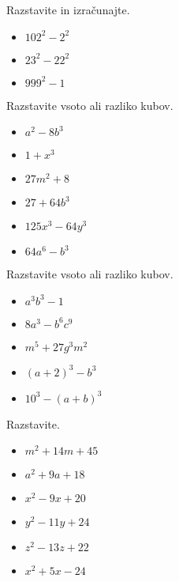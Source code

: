             \begin{naloga}
                Razstavite in izračunajte.
                \begin{itemize}
                    \item $102^2-2^2$  
                    \item $23^2-22^2$  
                    \item $999^2-1$ 
                \end{itemize}
            \end{naloga}
        
    
        
            \begin{naloga}
                Razstavite vsoto ali razliko kubov.
                \begin{itemize}
                    \item $a^2-8b^3$ 
                    \item $1+x^3$ 
                    \item $27m^2+8$ 
                    \item $27+64b^3$ 
                    \item $125x^3-64y^3$ 
                    \item $64a^6-b^3$ 
                \end{itemize}
            \end{naloga}
        
    
        
            \begin{naloga}
                Razstavite vsoto ali razliko kubov.
                \begin{itemize}
                    \item $a^3b^3-1$ 
                    \item $8a^3-b^6c^9$ 
                    \item $m^5+27g^3m^2$ 
                    \item $(a+2)^3-b^3$ 
                    \item $10^3-(a+b)^3$ 
                \end{itemize}
            \end{naloga}
        
    
        
            \begin{naloga}
                Razstavite.
                \begin{itemize}
                    \item $m^2+14m+45$ 
                    \item $a^2+9a+18$ 
                    \item $x^2-9x+20$ 
                    \item $y^2-11y+24$ 
                    \item $z^2-13z+22$ 
                    \item $x^2+5x-24$ 
                \end{itemize}
            \end{naloga}
        
